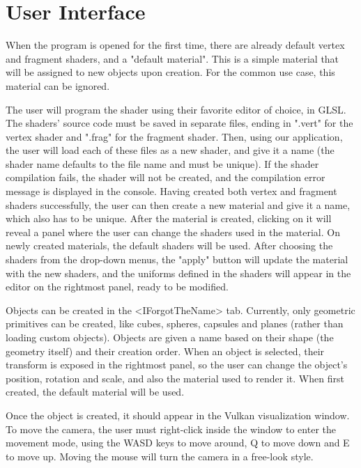 \section{User Interface}
When the program is opened for the first time, there are already default vertex and fragment shaders, and a "default material". This is a simple material that will be assigned to new objects upon creation. For the common use case, this material can be ignored.

The user will program the shader using their favorite editor of choice, in GLSL. The shaders' source code must be saved in separate files, ending in ".vert" for the vertex shader and ".frag" for the fragment shader. Then, using our application, the user will load each of these files as a new shader, and give it a name (the shader name defaults to the file name and must be unique). If the shader compilation fails, the shader will not be created, and the compilation error message is displayed in the console. Having created both vertex and fragment shaders successfully, the user can then create a new material and give it a name, which also has to be unique. After the material is created, clicking on it will reveal a panel where the user can change the shaders used in the material. On newly created materials, the default shaders will be used. After choosing the shaders from the drop-down menus, the "apply" button will update the material with the new shaders, and the uniforms defined in the shaders will appear in the editor on the rightmost panel, ready to be modified.

Objects can be created in the <IForgotTheName> tab. Currently, only geometric primitives can be created, like cubes, spheres, capsules and planes (rather than loading custom objects). Objects are given a name based on their shape (the geometry itself) and their creation order. When an object is selected, their transform is exposed in the rightmost panel, so the user can change the object's position, rotation and scale, and also the material used to render it. When first created, the default material will be used.

Once the object is created, it should appear in the Vulkan visualization window. To move the camera, the user must right-click inside the window to enter the movement mode, using the WASD keys to move around, Q to move down and E to move up. Moving the mouse will turn the camera in a free-look style.
